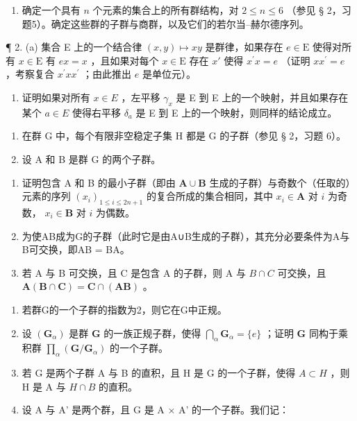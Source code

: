 \BourbakiExercisesSection

\begin{enumerate}
\def\labelenumi{\arabic{enumi}.}
\tightlist
\item
  确定一个具有 \(n\) 个元素的集合上的所有群结构，对 \(2 \leqslant n \leqslant 6\) （参见 § 2，习题5）。确定这些群的子群与商群，以及它们的若尔当–赫尔德序列。
\end{enumerate}

¶ 2. (a) 集合 E 上的一个结合律 \((x,y)\mapsto xy\) 是群律，如果存在 \(e\in\mathrm{E}\) 使得对所有 \(x\in\mathrm{E}\) 有 \(ex=x\) ，且如果对每个 \(x\in\mathrm{E}\) 存在 \(x'\) 使得 \(x^{\prime}x=e\) （证明 \(xx^{\prime}=e\) ，考察复合 \(x^{\prime}xx^{\prime}\) ；由此推出 \(e\) 是单位元）。

\begin{enumerate}
\def\labelenumi{(\alph{enumi})}
\setcounter{enumi}{1}
\tightlist
\item
  证明如果对所有 \(x \in E\) ，左平移 \(\gamma_{x}\) 是 E 到 E 上的一个映射，并且如果存在某个 \(a \in E\) 使得右平移 \(\delta_{a}\) 是 E 到 E 上的一个映射，则同样的结论成立。
\end{enumerate}

\begin{enumerate}
\def\labelenumi{\arabic{enumi}.}
\setcounter{enumi}{2}
\item
  在群 G 中，每个有限非空稳定子集 H 都是 G 的子群（参见 § 2，习题 6）。
\item
  设 A 和 B 是群 G 的两个子群。
\end{enumerate}

\begin{enumerate}
\def\labelenumi{(\alph{enumi})}
\item
  证明包含 A 和 B 的最小子群（即由 \(\mathbf{A} \cup \mathbf{B}\) 生成的子群）与奇数个（任取的）元素的序列 \((x_{i})_{1 \leqslant i \leqslant 2n + 1}\) 的复合所成的集合相同，其中 \(x_{i} \in \mathbf{A}\) 对 \(i\) 为奇数， \(x_{i} \in \mathbf{B}\) 对 \(i\) 为偶数。
\item
  为使AB成为G的子群（此时它是由A∪B生成的子群），其充分必要条件为A与B可交换，即AB = BA。
\item
  若 A 与 B 可交换，且 C 是包含 A 的子群，则 A 与 \(B \cap C\) 可交换，且 \(\mathbf{A}(\mathbf{B} \cap \mathbf{C}) = \mathbf{C} \cap (\mathbf{AB})\) 。
\end{enumerate}

\begin{enumerate}
\def\labelenumi{\arabic{enumi}.}
\setcounter{enumi}{4}
\item
  若群G的一个子群的指数为2，则它在G中正规。
\item
  设 \((\mathbf{G}_{\alpha})\) 是群 \(\mathbf{G}\) 的一族正规子群，使得 \(\bigcap_{\alpha} \mathbf{G}_{\alpha} = \{e\}\) ；证明 \(\mathbf{G}\) 同构于乘积群 \(\prod_{\alpha} (\mathbf{G} / \mathbf{G}_{\alpha})\) 的一个子群。
\item
  若 G 是两个子群 A 与 B 的直积，且 H 是 G 的一个子群，使得 \(A \subset H\) ，则 H 是 A 与 \(H \cap B\) 的直积。
\item
  设 A 与 A' 是两个群，且 G 是 A × A' 的一个子群。我们记：
\end{enumerate}

